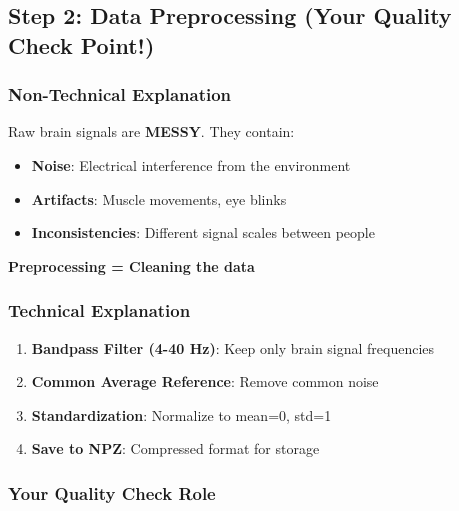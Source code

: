 \documentclass[12pt,a4paper]{article}
\begin{document}
\subsection{Step 2: Data Preprocessing (Your Quality Check Point!)}

\subsubsection{Non-Technical Explanation}

Raw brain signals are \textbf{MESSY}. They contain:

\begin{itemize}
    \item \textbf{Noise}: Electrical interference from the environment
    \item \textbf{Artifacts}: Muscle movements, eye blinks
    \item \textbf{Inconsistencies}: Different signal scales between people
\end{itemize}

\textbf{Preprocessing = Cleaning the data}

\subsubsection{Technical Explanation}

\begin{tcolorbox}[colback=cyan!10,colframe=cyan!50!black,title=Preprocessing Steps]
\begin{enumerate}
    \item \textbf{Bandpass Filter (4-40 Hz)}: Keep only brain signal frequencies
    \item \textbf{Common Average Reference}: Remove common noise
    \item \textbf{Standardization}: Normalize to mean=0, std=1
    \item \textbf{Save to NPZ}: Compressed format for storage
\end{enumerate}
\end{tcolorbox}

\subsubsection{Your Quality Check Role}
\end{document}
